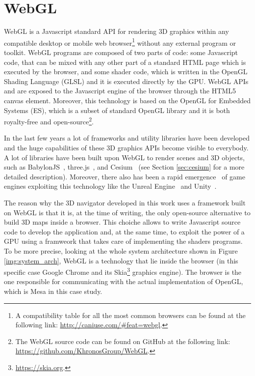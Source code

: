 \section{WebGL} \label{sec:webgl}
WebGL is a Javascript standard API for rendering 3D graphics within any compatible
desktop or mobile web browser\footnote{A compatibility table for all the most
common browsers can be found at the following link: \url{http://caniuse.com/#feat=webgl}.}
without any external program or toolkit. WebGL programs are composed of two parts
of code: some Javascript code, that can be mixed with any other part of a standard
HTML page which is executed by the browser, and some shader code, which is written 
in the OpenGL Shading Language (GLSL) and it is executed directly by the GPU.
WebGL APIs and are exposed to the Javascript engine of the browser through the
HTML5 canvas element. Moreover, this technology is based on the OpenGL for Embedded
Systems (ES),
which is a subset of standard OpenGL library and it is both
royalty-free and open-source\footnote{The WebGL source code can be found on GitHub
at the following link: \url{https://github.com/KhronosGroup/WebGL}.}.

In the last few years a lot of frameworks and utility libraries have been developed
and the huge capabilities of these 3D graphics APIs become visible to everybody.
A lot of libraries have been built upon WebGL to render scenes and 3D objects, such
as BabylonJS~\cite{babylon3d}, three.js~\cite{cabello2010three}, and 
Cesium~\cite{cozzi20113d} (see Section \ref{sec:cesium} for a more detailed description).
Moreover, there also has been a rapid emergence~\cite{parisi2014programming} of
game engines exploiting this technology like the Unreal Engine~\cite{games2007unreal}
and Unity~\cite{engine9unity}.

The reason why the 3D navigator developed in this work uses a framework built on
WebGL is that it is, at the time of writing, the only open-source alternative to
build 3D maps inside a browser. This choiche allows to write Javascript source
code to develop the application and, at the same time, to exploit the power of
a GPU using a framweork that takes care of implementing the shaders programs.
To be more precise, looking at the whole system architecture shown in Figure
\ref{img:system_arch}, WebGL is a technology that lie inside the browser
(in this specific case Google Chrome and its Skia\footnote{\url{https://skia.org}.}
graphics engine). The browser is the one responsible for communicating with
the actual implementation of OpenGL, which is Mesa in this case study.


